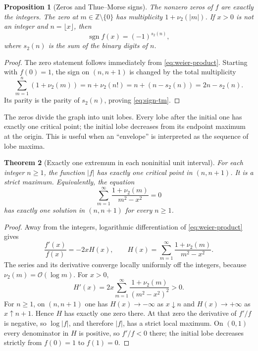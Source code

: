 \documentclass[11pt,oneside]{article}
\newtheorem{theorem}{Theorem}[section]
\newtheorem{proposition}[theorem]{Proposition}
\theoremstyle{definition}
\theoremstyle{remark}
\newcommand{\Z}{\mathbb Z}
\newcommand{\bigO}{\mathcal O}
\newcommand{\sgn}{\operatorname{sgn}}
\newcommand{\vtwo}{\nu_2}
\newcommand{\wt}{s_2}
\begin{document}
\begin{proposition}[Zeros and Thue--Morse signs]
The nonzero zeros of $f$ are exactly the integers.  The zero at
$m\in\Z\setminus\{0\}$ has multiplicity $1+\vtwo(|m|)$.  If $x>0$ is not an
integer and $n=\lfloor x\rfloor$, then
\begin{equation}
 \sgn f(x)=(-1)^{\wt(n)},                                   \label{eq:sign-tm}
\end{equation}
where $\wt(n)$ is the sum of the binary digits of $n$.
\end{proposition}

\begin{proof}
The zero statement follows immediately from \eqref{eq:weier-product}.  Starting
with $f(0)=1$, the sign on $(n,n+1)$ is changed by the total multiplicity
\[
 \sum_{m=1}^{n}(1+\vtwo(m))
 =n+\vtwo(n!)=n+(n-\wt(n))=2n-\wt(n).
\]
Its parity is the parity of $\wt(n)$, proving \eqref{eq:sign-tm}.
\end{proof}

The zeros divide the graph into unit lobes.  Every lobe after the initial
one has exactly one critical point; the initial lobe decreases from its endpoint
maximum at the origin.  This is useful when an ``envelope'' is interpreted as
the sequence of lobe maxima.

\begin{theorem}[Exactly one extremum in each noninitial unit interval]
For each integer $n\ge1$, the function $|f|$ has exactly one critical point in
$(n,n+1)$.  It is a strict maximum.  Equivalently, the equation
\begin{equation}
 \sum_{m=1}^{\infty}\frac{1+\vtwo(m)}{m^2-x^2}=0            \label{eq:critical-equation}
\end{equation}
has exactly one solution in $(n,n+1)$ for every $n\ge1$.
\end{theorem}

\begin{proof}
Away from the integers, logarithmic differentiation of
\eqref{eq:weier-product} gives
\[
 \frac{f'(x)}{f(x)}=-2xH(x),\qquad
 H(x)=\sum_{m=1}^{\infty}\frac{1+\vtwo(m)}{m^2-x^2}.
\]
The series and its derivative converge locally uniformly off the integers,
because $\vtwo(m)=\bigO(\log m)$.  For $x>0$,
\[
 H'(x)=2x\sum_{m=1}^{\infty}
 \frac{1+\vtwo(m)}{(m^2-x^2)^2}>0.
\]
For $n\ge1$, on $(n,n+1)$ one has $H(x)\to-\infty$ as $x\downarrow n$ and
$H(x)\to+\infty$ as $x\uparrow n+1$.  Hence $H$ has exactly one zero there.
At that zero the derivative of $f'/f$ is negative, so $\log|f|$, and therefore
$|f|$, has a strict local maximum.  On $(0,1)$ every denominator in $H$ is
positive, so $f'/f<0$ there; the initial lobe decreases strictly from $f(0)=1$
to $f(1)=0$.
\end{proof}
\end{document}
